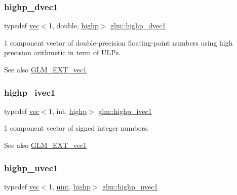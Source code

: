 \subsubsection{\texorpdfstring{highp\+\_\+dvec1}{highp\_dvec1}}
{\footnotesize\ttfamily typedef \mbox{\hyperlink{structglm_1_1vec}{vec}}$<$1, double, \mbox{\hyperlink{namespaceglm_a36ed105b07c7746804d7fdc7cc90ff25ac6f7eab42eacbb10d59a58e95e362074}{highp}}$>$ \mbox{\hyperlink{group__ext__vec1_ga51e54e6b2fe3962fc44a176eeb3e3fe6}{glm\+::highp\+\_\+dvec1}}}

1 component vector of double-\/precision floating-\/point numbers using high precision arithmetic in term of U\+L\+Ps.

\begin{DoxySeeAlso}{See also}
\mbox{\hyperlink{group__ext__vec1}{G\+L\+M\+\_\+\+E\+X\+T\+\_\+vec1}} 
\end{DoxySeeAlso}
\mbox{\label{group__ext__vec1_gac44dcd92c25ab0d3f5c514137d5460d8}} 
\subsubsection{\texorpdfstring{highp\+\_\+ivec1}{highp\_ivec1}}
{\footnotesize\ttfamily typedef \mbox{\hyperlink{structglm_1_1vec}{vec}}$<$1, int, \mbox{\hyperlink{namespaceglm_a36ed105b07c7746804d7fdc7cc90ff25ac6f7eab42eacbb10d59a58e95e362074}{highp}}$>$ \mbox{\hyperlink{group__ext__vec1_gac44dcd92c25ab0d3f5c514137d5460d8}{glm\+::highp\+\_\+ivec1}}}

1 component vector of signed integer numbers.

\begin{DoxySeeAlso}{See also}
\mbox{\hyperlink{group__ext__vec1}{G\+L\+M\+\_\+\+E\+X\+T\+\_\+vec1}} 
\end{DoxySeeAlso}
\mbox{\label{group__ext__vec1_ga4e92a1105fa908e8a96971602381e381}} 
\subsubsection{\texorpdfstring{highp\+\_\+uvec1}{highp\_uvec1}}
{\footnotesize\ttfamily typedef \mbox{\hyperlink{structglm_1_1vec}{vec}}$<$1, \mbox{\hyperlink{group__core__precision_ga4fd29415871152bfb5abd588334147c8}{uint}}, \mbox{\hyperlink{namespaceglm_a36ed105b07c7746804d7fdc7cc90ff25ac6f7eab42eacbb10d59a58e95e362074}{highp}}$>$ \mbox{\hyperlink{group__ext__vec1_ga4e92a1105fa908e8a96971602381e381}{glm\+::highp\+\_\+uvec1}}}

